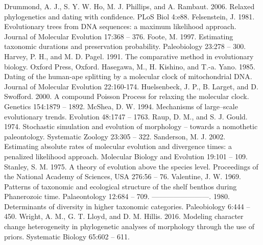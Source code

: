 \documentclass{article}
\begin{document}
Drummond, A. J., S. Y. W. Ho, M. J. Phillips, and A. Rambaut.  2006.  Relaxed phylogenetics and dating with confidence.  PLoS Biol 4:e88. 
Felsenstein, J.  1981.  Evolutionary trees from DNA sequences: a maximum likelihood approach.  Journal of Molecular Evolution 17:368 – 376. 
Foote, M.  1997.  Estimating taxonomic durations and preservation probability.  Paleobiology 23:278 – 300.
Harvey, P. H., and M. D. Pagel.  1991.  The comparative method in evolutionary biology.  Oxford Press, Oxford.   
Hasegawa, M., H. Kishino, and T.-a. Yano.  1985.  Dating of the human-ape splitting by a molecular clock of mitochondrial DNA.  Journal of Molecular Evolution 22:160-174. 
Huelsenbeck, J. P., B. Larget, and D. Swofford.  2000.  A compound Poisson Process for relaxing the molecular clock.  Genetics 154:1879 – 1892. 
McShea, D. W.  1994.  Mechanisms of large–scale evolutionary trends.  Evolution 48:1747 – 1763.
Raup, D. M., and S. J. Gould.  1974.  Stochastic simulation and evolution of morphology – towards a nomothetic paleontology.  Systematic Zoology 23:305 – 322. 
Sanderson, M. J.  2002.  Estimating absolute rates of molecular evolution and divergence times: a penalized likelihood approach.  Molecular Biology and Evolution 19:101 – 109. 
Stanley, S. M.  1975.  A theory of evolution above the species level.  Proceedings of the National Academy of Sciences, USA 276:56 – 76. 
Valentine, J. W.  1969.  Patterns of taxonomic and ecological structure of the shelf benthos during Phanerozoic time.  Palaeontology 12:684 – 709. 
————————.  1980.  Determinants of diversity in higher taxonomic categories.  Paleobiology 6:444 – 450. 
Wright, A. M., G. T. Lloyd, and D. M. Hillis.  2016.  Modeling character change heterogeneity in phylogenetic analyses of morphology through the use of priors.  Systematic Biology 65:602 – 611.


 

\end{document}
